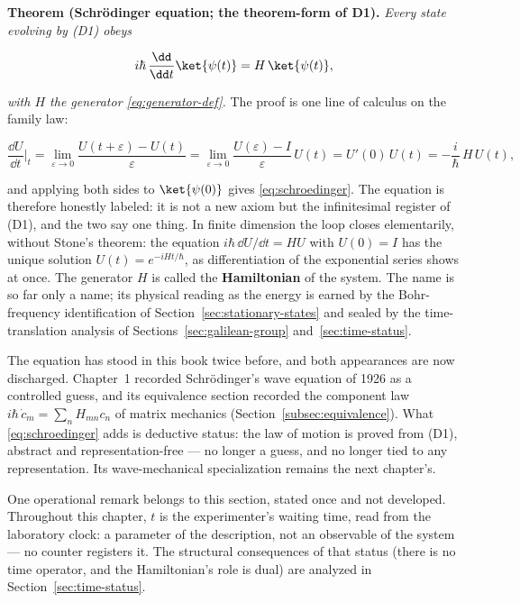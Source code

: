 \medskip\noindent\textbf{Theorem (Schr\"odinger equation; the theorem-form of D1).} \emph{Every state evolving by \textup{(D1)} obeys}
\begin{linenomath}
    \begin{equation}
        i\hbar\,\frac{\dd}{\dd t}\ket{\psi(t)} = H\,\ket{\psi(t)},
        \label{eq:schroedinger}
    \end{equation}
\end{linenomath}
\emph{with $H$ the generator \eqref{eq:generator-def}.} The proof is one line of calculus on the family law:
\begin{linenomath}
    \begin{equation*}
        \frac{\dd U}{\dd t}\bigg|_{t} = \lim_{\varepsilon\to 0}\frac{U(t+\varepsilon) - U(t)}{\varepsilon} = \lim_{\varepsilon\to 0}\frac{U(\varepsilon) - I}{\varepsilon}\,U(t) = U'(0)\,U(t) = -\frac{i}{\hbar}\,H\,U(t),
    \end{equation*}
\end{linenomath}
and applying both sides to $\ket{\psi(0)}$ gives \eqref{eq:schroedinger}. The equation is therefore honestly labeled: it is not a new axiom but the infinitesimal register of (D1), and the two say one thing. In finite dimension the loop closes elementarily, without Stone's theorem: the equation $i\hbar\,\dd U/\dd t = HU$ with $U(0) = I$ has the unique solution $U(t) = e^{-iHt/\hbar}$, as differentiation of the exponential series shows at once. The generator $H$ is called the \textbf{Hamiltonian} of the system. The name is so far only a name; its physical reading as the energy is earned by the Bohr-frequency identification of Section~\ref{sec:stationary-states} and sealed by the time-translation analysis of Sections~\ref{sec:galilean-group} and~\ref{sec:time-status}.

The equation has stood in this book twice before, and both appearances are now discharged. Chapter~1 recorded Schr\"odinger's wave equation of 1926 as a controlled guess, and its equivalence section recorded the component law $i\hbar\,\dot c_m = \sum_n H_{mn} c_n$ of matrix mechanics (Section~\ref{subsec:equivalence}). What \eqref{eq:schroedinger} adds is deductive status: the law of motion is proved from (D1), abstract and representation-free --- no longer a guess, and no longer tied to any representation. Its wave-mechanical specialization remains the next chapter's.

One operational remark belongs to this section, stated once and not developed. Throughout this chapter, $t$ is the experimenter's waiting time, read from the laboratory clock: a parameter of the description, not an observable of the system --- no counter registers it. The structural consequences of that status (there is no time operator, and the Hamiltonian's role is dual) are analyzed in Section~\ref{sec:time-status}.

